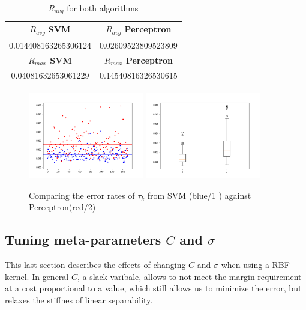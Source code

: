 \begin{table}[!h]
 \begin{center}
\begin{tabular}{|c|c|}
 \hline
 \textbf{$R_{avg}$ SVM} & \textbf{ $R_{avg}$ Perceptron} \\
 \hline
 0.014408163265306124       &     0.02609523809523809      \\
 \hline
  \hline
 \textbf{$R_{max}$ SVM} & \textbf{ $R_{max}$ Perceptron} \\
 \hline
0.04081632653061229       &     0.14540816326530615      \\
 \hline
\end{tabular}
\caption{\label{tab:avg_error} $R_{avg}$ for both algorithms }
\end{center}
\end{table}
\begin{figure}[!h]
\begin{center}
\centering
\includegraphics[width=0.45\textwidth]{figures/new/perc_vs_svm}
\includegraphics[width=0.45\textwidth]{figures/new/perc_vs_svm_boxplot}
\end{center}
\caption{\label{fig:error_SVM_perc} Comparing the error rates of $\tau_k$ from SVM (blue/1 ) against Perceptron(red/2) }
\end{figure}
\subsection{Tuning meta-parameters $C$ and $\sigma$}
This last section describes the effects of changing $C$ and $\sigma$ when using a RBF-kernel. In general $C$, a slack varibale, allows to not meet the margin requirement at a cost proportional to a value, which still allows us to minimize the error, but relaxes the stiffnes of linear separability.

